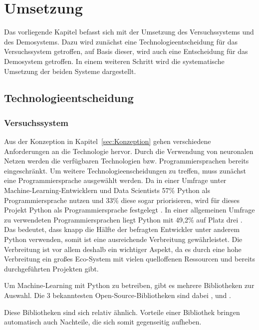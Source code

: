 \section{Umsetzung}

Das vorliegende Kapitel befasst sich mit der Umsetzung des Versuchssystems und des Demosystems.
Dazu wird zunächst eine Technologieentscheidung für das Versuchssystem getroffen, auf Basis dieser, wird auch eine Entscheidung für das Demosystem getroffen.
In einem weiteren Schritt wird die systematische Umsetzung der beiden Systeme dargestellt.

\subsection{Technologieentscheidung}

\subsubsection{Versuchssystem}\label{sec:TechnologieVersuchssystem}

Aus der Konzeption in Kapitel~\ref{sec:Konzeption} gehen verschiedene Anforderungen an die Technologie hervor.
Durch die Verwendung von neuronalen Netzen werden die verfügbaren Technologien bzw. Programmiersprachen bereits eingeschränkt.
Um weitere Technologieenscheidungen zu treffen, muss zunächst eine Programmiersprache ausgewählt werden.
Da in einer Umfrage unter Machine-Learning-Entwicklern und Data Scientists 57\% Python als Programmiersprache nutzen und 33\% diese sogar priorisieren, wird für dieses Projekt Python als Programmiersprache festgelegt \autocite[vgl. ][S. 16]{vision_mobile_state_2017}.
In einer allgemeinen Umfrage zu verwendeten Programmiersprachen liegt Python mit 49,2\% auf Platz drei \autocite[vgl.][]{yepis_2023_2023}.
Das bedeutet, dass knapp die Hälfte der befragten Entwickler unter anderem Python verwenden, somit ist eine ausreichende Verbreitung gewährleistet.
Die Verbreitung ist vor allem deshalb ein wichtiger Aspekt, da es durch eine hohe Verbreitung ein großes Eco-System mit vielen quelloffenen Ressourcen und bereits durchgeführten Projekten gibt.

Um Machine-Learning mit Python zu betreiben, gibt es mehrere Bibliotheken zur Auswahl.
Die 3 bekanntesten Open-Source-Bibliotheken sind dabei ,  und  \autocite[vgl.][]{msv_tensorflow_2020}.

Diese Bibliotheken sind sich relativ ähnlich.
Vorteile einer Bibliothek bringen automatisch auch Nachteile, die sich somit gegenseitig aufheben.


